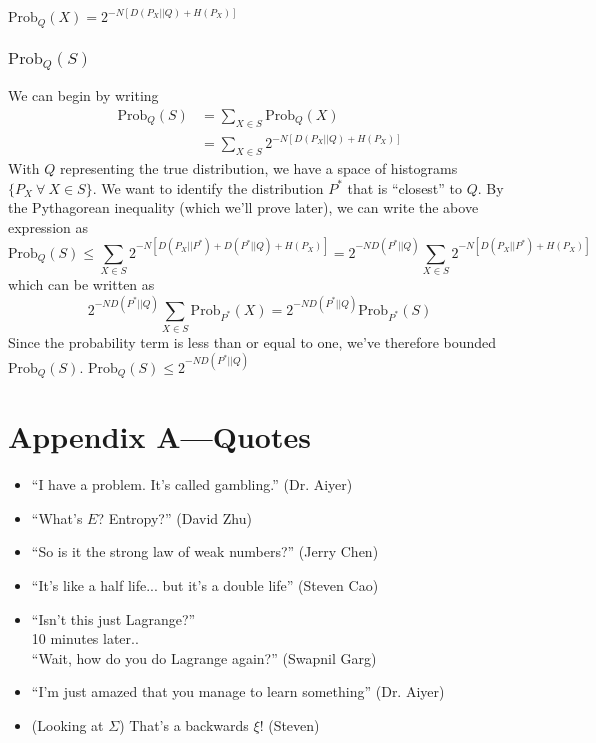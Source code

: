 \documentclass[11pt]{article}
\theoremstyle{definition}
\begin{document}
\theorem $\text{Prob}_Q(X) = 2^{-N[D(P_X || Q) + H(P_X)]}$

\subsubsection{$\text{Prob}_Q(S)$}

We can begin by writing 
\begin{align*}
\text{Prob}_Q(S) &= \sum_{X \in S} \text{Prob}_Q(X) \\
	&= \sum_{X \in S} 2^{-N[D(P_X || Q) + H(P_X)]}
\end{align*}
With $Q$ representing the true distribution, we have a space of histograms $\{P_X \: \forall \:  X \in S\}$. We want to identify the distribution $P^*$ that is ``closest'' to $Q$. By the Pythagorean inequality (which we'll prove later), we can write the above expression as
$$\text{Prob}_Q(S) \leq \sum_{X \in S} 2^{-N[D(P_X || P^*) + D(P^* || Q) + H(P_X)]}  = 2^{-ND(P^* || Q)} \sum_{X \in S} 2^{-N[D(P_X || P^*) + H(P_X)]}$$which can be written as $$2^{-ND(P^*||Q)} \sum_{X \in S} \text{Prob}_{P^*}(X) = 2^{-ND(P^*||Q)} \text{Prob}_{P^*}(S)$$Since the probability term is less than or equal to one, we've therefore bounded $\text{Prob}_Q(S)$.
  $\text{Prob}_Q(S) \leq 2^{-ND(P^*||Q)}$
\newpage
\section*{Appendix A---Quotes}
\begin{itemize}
\item ``I have a problem. It's called gambling.'' (Dr. Aiyer)
\item ``What's $E$? Entropy?'' (David Zhu)
\item ``So is it the strong law of weak numbers?'' (Jerry Chen)
\item ``It's like a half life... but it's a double life'' (Steven Cao)
\item ``Isn't this just Lagrange?''  \\ 10 minutes later.. \\ ``Wait, how do you do Lagrange again?'' (Swapnil Garg)
\item ``I'm just amazed that you manage to learn something'' (Dr. Aiyer)
\item (Looking at $\Sigma$) That's a backwards $\xi$! (Steven)
\end{itemize}
\end{document}
